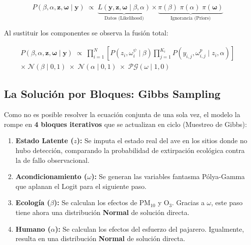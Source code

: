 \documentclass[12pt, a4paper]{article}
\begin{document}
\begin{equation}
  \boxed{
  P\!\left(\beta, \alpha, \mathbf{z}, \boldsymbol{\omega} \mid \mathbf{y}\right)
  \;\propto\;
  \underbrace{L\!\left(\mathbf{y}, \mathbf{z}, \boldsymbol{\omega} \mid \beta, \alpha\right)}_{\text{Datos (Likelihood)}}
  \times
  \underbrace{\pi(\beta)\;\pi(\alpha)\;\pi(\boldsymbol{\omega})}_{\text{Ignorancia (Priors)}}
  }
\end{equation}

Al sustituir los componentes se observa la fusión total:

\begin{multline}
  P\!\left(\beta, \alpha, \mathbf{z}, \boldsymbol{\omega} \mid \mathbf{y}\right)
  \;\propto\;
  \prod_{i=1}^N
  \left[
    P\!\left(z_i, \omega^\psi_i \mid \beta\right)
    \prod_{j=1}^{K_i}
    P\!\left(y_{i,j}, \omega^p_{i,j} \mid z_i, \alpha\right)
  \right] \\
  \times\;
  \mathcal{N}(\beta \mid 0, 1)
  \;\times\;
  \mathcal{N}(\alpha \mid 0, 1)
  \;\times\;
  \mathcal{PG}(\omega \mid 1, 0)
\end{multline}

\subsection{La Solución por Bloques: Gibbs Sampling}

Como no es posible resolver la ecuación conjunta de una sola vez, el modelo la rompe en \textbf{4 bloques iterativos} que se actualizan en ciclo (Muestreo de Gibbs):

\begin{enumerate}[label=\textbf{Bloque \arabic*.}]
  \item \textbf{Estado Latente ($z$):} Se imputa el estado real del ave en los sitios donde no hubo detección, comparando la probabilidad de extirpación ecológica contra la de fallo observacional.
  \item \textbf{Acondicionamiento ($\omega$):} Se generan las variables fantasma Pólya-Gamma que aplanan el Logit para el siguiente paso.
  \item \textbf{Ecología ($\beta$):} Se calculan los efectos de $\text{PM}_{10}$ y $\text{O}_3$. Gracias a $\omega$, este paso tiene ahora una distribución \textbf{Normal} de solución directa.
  \item \textbf{Humano ($\alpha$):} Se calculan los efectos del esfuerzo del pajarero. Igualmente, resulta en una distribución \textbf{Normal} de solución directa.
\end{enumerate}
\end{document}
